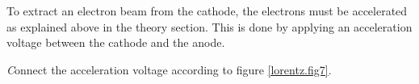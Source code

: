 \documentclass[../Elmag-labhefte-2020.tex]{subfiles}
\begin{document}


To extract an electron beam from the cathode, the electrons must be accelerated as explained above in the theory section. This is done by applying an acceleration voltage between the cathode and the anode.

{\emph Connect the acceleration voltage according to figure \ref{lorentz.fig7}}. %
\end{document}
